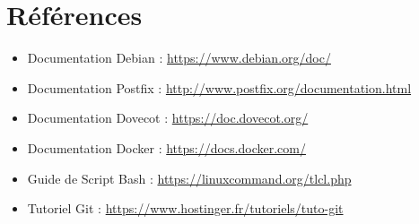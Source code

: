 \documentclass[a4paper,12pt]{article}
\begin{document}
\section{Références}

\begin{itemize}
    \item Documentation Debian : \url{https://www.debian.org/doc/}
    \item Documentation Postfix : \url{http://www.postfix.org/documentation.html}
    \item Documentation Dovecot : \url{https://doc.dovecot.org/}
    \item Documentation Docker : \url{https://docs.docker.com/}
    \item Guide de Script Bash : \url{https://linuxcommand.org/tlcl.php}
    \item Tutoriel Git : \url{https://www.hostinger.fr/tutoriels/tuto-git}
\end{itemize}
\end{document}
